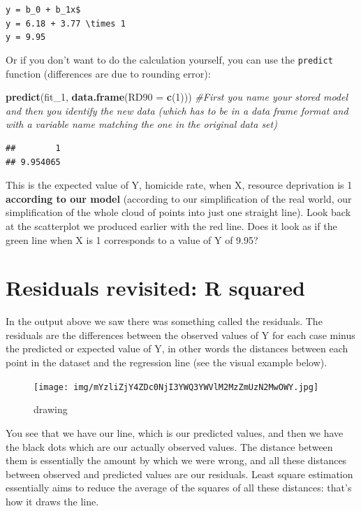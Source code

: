 \documentclass[]{book}
\newenvironment{Shaded}{\begin{snugshade}}{\end{snugshade}}
\newcommand{\CommentTok}[1]{\textcolor[rgb]{0.56,0.35,0.01}{\textit{#1}}}
\newcommand{\DataTypeTok}[1]{\textcolor[rgb]{0.13,0.29,0.53}{#1}}
\newcommand{\DecValTok}[1]{\textcolor[rgb]{0.00,0.00,0.81}{#1}}
\newcommand{\KeywordTok}[1]{\textcolor[rgb]{0.13,0.29,0.53}{\textbf{#1}}}
\newcommand{\NormalTok}[1]{#1}
\begin{document}
\texttt{y\ =\ b\_0\ +\ b\_1x\$}\\
\texttt{y\ =\ 6.18\ +\ 3.77\ \textbackslash{}times\ 1}~\\
\texttt{y\ =\ 9.95}

Or if you don't want to do the calculation yourself, you can use the \texttt{predict} function (differences are due to rounding error):

\begin{Shaded}
\begin{Highlighting}[]
\KeywordTok{predict}\NormalTok{(fit_}\DecValTok{1}\NormalTok{, }\KeywordTok{data.frame}\NormalTok{(}\DataTypeTok{RD90 =} \KeywordTok{c}\NormalTok{(}\DecValTok{1}\NormalTok{))) }\CommentTok{#First you name your stored model and then you identify the new data (which has to be in a data frame format and with a variable name matching the one in the original data set)}
\end{Highlighting}
\end{Shaded}

\begin{verbatim}
##        1 
## 9.954065
\end{verbatim}

This is the expected value of Y, homicide rate, when X, resource deprivation is 1 \textbf{according to our model} (according to our simplification of the real world, our simplification of the whole cloud of points into just one straight line). Look back at the scatterplot we produced earlier with the red line. Does it look as if the green line when X is 1 corresponds to a value of Y of 9.95?

\hypertarget{residuals-revisited-r-squared}{%
\section{Residuals revisited: R squared}\label{residuals-revisited-r-squared}}

In the output above we saw there was something called the residuals. The residuals are the differences between the observed values of Y for each case minus the predicted or expected value of Y, in other words the distances between each point in the dataset and the regression line (see the visual example below).

\begin{figure}
\centering
\texttt{[image: img/mYzliZjY4ZDc0NjI3YWQ3YWVlM2MzZmUzN2MwOWY.jpg]}
\caption{drawing}
\end{figure}

You see that we have our line, which is our predicted values, and then we have the black dots which are our actually observed values. The distance between them is essentially the amount by which we were wrong, and all these distances between observed and predicted values are our residuals. Least square estimation essentially aims to reduce the average of the squares of all these distances: that's how it draws the line.
\end{document}
